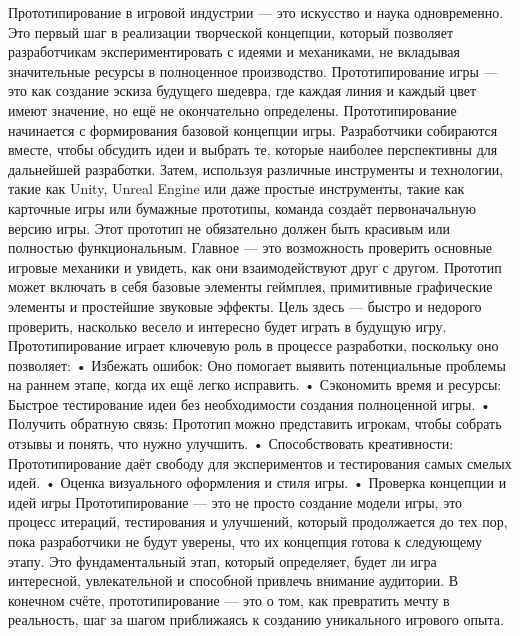 Прототипирование в игровой индустрии — это искусство и наука одновременно. Это первый шаг в реализации творческой концепции, который позволяет разработчикам экспериментировать с идеями и механиками, не вкладывая значительные ресурсы в полноценное производство. Прототипирование игры — это как создание эскиза будущего шедевра, где каждая линия и каждый цвет имеют значение, но ещё не окончательно определены.
Прототипирование начинается с формирования базовой концепции игры. Разработчики собираются вместе, чтобы обсудить идеи и выбрать те, которые наиболее перспективны для дальнейшей разработки. Затем, используя различные инструменты и технологии, такие как Unity, Unreal Engine или даже простые инструменты, такие как карточные игры или бумажные прототипы, команда создаёт первоначальную версию игры.
Этот прототип не обязательно должен быть красивым или полностью функциональным. Главное — это возможность проверить основные игровые механики и увидеть, как они взаимодействуют друг с другом. Прототип может включать в себя базовые элементы геймплея, примитивные графические элементы и простейшие звуковые эффекты. Цель здесь — быстро и недорого проверить, насколько весело и интересно будет играть в будущую игру.
Прототипирование играет ключевую роль в процессе разработки, поскольку оно позволяет:\newline
    • Избежать ошибок: Оно помогает выявить потенциальные проблемы на раннем этапе, когда их ещё легко исправить.\newline
    • Сэкономить время и ресурсы: Быстрое тестирование идеи без необходимости создания полноценной игры.\newline
    • Получить обратную связь: Прототип можно представить игрокам, чтобы собрать отзывы и понять, что нужно улучшить.\newline
    • Способствовать креативности: Прототипирование даёт свободу для экспериментов и тестирования самых смелых идей.\newline
    • Оценка визуального оформления и стиля игры. \newline
    • Проверка концепции и идей игры \newline
Прототипирование — это не просто создание модели игры, это процесс итераций, тестирования и улучшений, который продолжается до тех пор, пока разработчики не будут уверены, что их концепция готова к следующему этапу. Это фундаментальный этап, который определяет, будет ли игра интересной, увлекательной и способной привлечь внимание аудитории. В конечном счёте, прототипирование — это о том, как превратить мечту в реальность, шаг за шагом приближаясь к созданию уникального игрового опыта.



